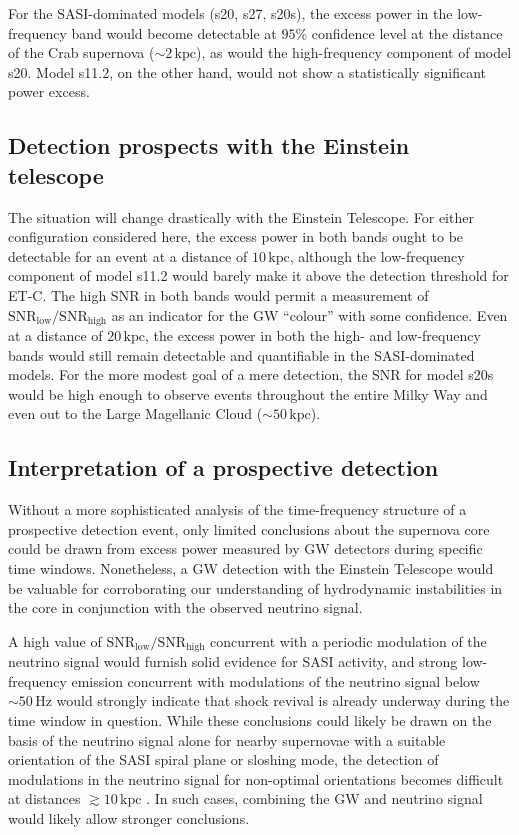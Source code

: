 For the SASI-dominated models (s20, s27, s20s), the excess
power in the low-frequency band would become detectable
at $95 \%$ confidence level at the distance of the Crab supernova
($\mathord{\sim} 2 \, \mathrm{kpc}$), as would the high-frequency
component of model s20. Model s11.2, on the other hand, would not
show a statistically significant
power excess. 

\subsection{Detection prospects with the Einstein telescope}
The situation will change drastically with the Einstein Telescope.  For
either configuration considered here, the excess power in both bands
ought to be detectable for an event at a distance of $10
\, \mathrm{kpc}$, although the low-frequency component of model s11.2
would barely make it above the detection threshold
for ET-C. The high SNR in both bands would permit
a measurement of $\mathrm{SNR}_\mathrm{low}/\mathrm{SNR}_\mathrm{high}$
as an indicator for the GW ``colour'' with some confidence.
Even at a distance of $20 \, \mathrm{kpc}$, the excess power in
both the high- and low-frequency bands would still remain detectable
and quantifiable in the SASI-dominated models.
For the more modest goal of a mere detection, the SNR for
model s20s would be high enough to observe events throughout
the entire Milky Way and even out to the Large Magellanic
Cloud ($\mathord{\sim} 50 \, \mathrm{kpc}$).

\subsection{Interpretation of a prospective detection}
Without a more sophisticated analysis of the time-frequency
structure of a prospective detection event, only limited conclusions
about the supernova core could be drawn from excess power
measured by GW detectors during specific time windows. Nonetheless, a GW
detection with the Einstein Telescope would be valuable for corroborating
our understanding of hydrodynamic instabilities in the core
in conjunction with the observed neutrino signal.

A high value of
$\mathrm{SNR}_\mathrm{low}/\mathrm{SNR}_\mathrm{high}$ concurrent
with a periodic modulation of the neutrino signal
\citep{marek_08,lund_10,brandt_11,tamborra_13, mueller_14,tamborra_14b} would
furnish solid evidence for SASI activity, and strong
low-frequency emission concurrent with modulations of the
neutrino signal below $\mathord{\sim} 50 \, \mathrm{Hz}$ would strongly
indicate that shock revival is already underway during the
time window in question. While these conclusions could likely
be drawn on the basis of the neutrino signal alone for nearby
supernovae with a suitable orientation of the SASI spiral
plane or sloshing mode, the detection of modulations
in the neutrino signal for non-optimal orientations becomes
difficult at
distances $\gtrsim 10 \, \mathrm{kpc}$
\citep{mueller_14}. In such cases, combining the GW and neutrino
signal would likely allow stronger conclusions.

